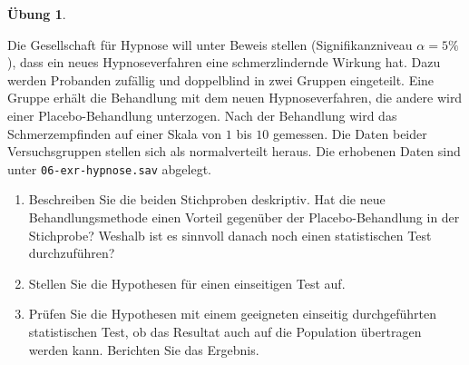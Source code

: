 \documentclass[
]{book}
\providecommand{\tightlist}{%
  \setlength{\itemsep}{0pt}\setlength{\parskip}{0pt}}
\theoremstyle{definition}
\theoremstyle{definition}
\theoremstyle{definition}
\newtheorem{exercise}{Übung}[chapter]
\theoremstyle{definition}
\theoremstyle{remark}
\begin{document}
\begin{exercise}
\protect\hypertarget{exr:hypnose}{}\label{exr:hypnose}\leavevmode

Die Gesellschaft für Hypnose will unter Beweis stellen (Signifikanzniveau \(\alpha=5\%\)), dass ein neues Hypnoseverfahren eine schmerzlindernde Wirkung hat. Dazu werden Probanden zufällig und doppelblind in zwei Gruppen eingeteilt. Eine Gruppe erhält die Behandlung mit dem neuen Hypnoseverfahren, die andere wird einer Placebo-Behandlung unterzogen. Nach der Behandlung wird das Schmerzempfinden auf einer Skala von \(1\) bis \(10\) gemessen. Die Daten beider Versuchsgruppen stellen sich als normalverteilt heraus. Die erhobenen Daten sind unter \texttt{06-exr-hypnose.sav} abgelegt.

\begin{enumerate}
\def\labelenumi{\alph{enumi})}
\tightlist
\item
  Beschreiben Sie die beiden Stichproben deskriptiv. Hat die neue Behandlungsmethode einen Vorteil gegenüber der Placebo-Behandlung in der Stichprobe? Weshalb ist es sinnvoll danach noch einen statistischen Test durchzuführen?
\item
  Stellen Sie die Hypothesen für einen einseitigen Test auf.
\item
  Prüfen Sie die Hypothesen mit einem geeigneten einseitig durchgeführten statistischen Test, ob das Resultat auch auf die Population übertragen werden kann. Berichten Sie das Ergebnis.
\end{enumerate}

\end{exercise}
\end{document}
